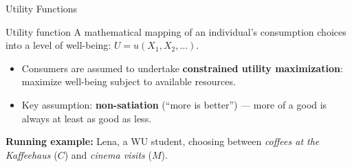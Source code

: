 \documentclass[11pt,aspectratio=169]{beamer}
\begin{document}
\begin{frame}{Utility Functions}
  \begin{block}{Utility function}
    A mathematical mapping of an individual's consumption choices into a level of well-being: $U = u(X_1, X_2, \ldots)$.
  \end{block}
  \begin{itemize}
    \item Consumers are assumed to undertake \textbf{constrained utility maximization}: maximize well-being subject to available resources.
    \item Key assumption: \textbf{non-satiation} (``more is better'') --- more of a good is always at least as good as less.
  \end{itemize}
  \vspace{0.5em}
  \centering
  \textbf{Running example:} Lena, a WU student, choosing between \emph{coffees at the Kaffeehaus} ($C$) and \emph{cinema visits} ($M$).
\end{frame}
\end{document}
